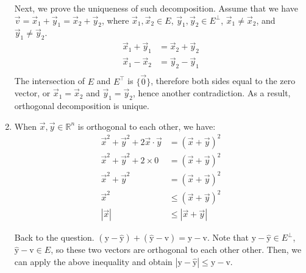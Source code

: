 \documentclass{article}
\begin{document}
\begin{enumerate}[1.]
Next, we prove the uniqueness of such decomposition. Assume that we have $\vec{v} = \vec{x}_1 + \vec{y}_1 = \vec{x}_2 + \vec{y}_2$, where $\vec{x}_1, \vec{x}_2 \in E$, $\vec{y}_1, \vec{y}_2 \in E^{\bot}$, $\vec{x}_1 \neq \vec{x}_2$, and $\vec{y}_1 \neq \vec{y}_2$.
$$
\begin{aligned}
\vec{x}_1 + \vec{y}_1 &= \vec{x}_2 + \vec{y}_2 \\
\vec{x}_1 - \vec{x}_2 &= \vec{y}_2 - \vec{y}_1 \\
\end{aligned}
$$
The intersection of $E$ and $E^{\top}$ is $\{\vec{0}\}$, therefore both sides equal to the zero vector, or $\vec{x}_1 = \vec{x}_2$ and $\vec{y}_1 = \vec{y}_2$, hence another contradiction. As a result, orthogonal decomposition is unique. \rQED

\item
When $\vec{x}, \vec{y} \in \mathbb{R}^n$ is orthogonal to each other, we have:
\begin{align*}
\vec{x}^2 + \vec{y}^2 + 2\vec{x}\cdot\vec{y} &= (\vec{x} + \vec{y})^2\\
\vec{x}^2 + \vec{y}^2 + 2 \times 0 &= (\vec{x} + \vec{y})^2\\
\vec{x}^2 + \vec{y}^2 &= (\vec{x} + \vec{y})^2 \\
\vec{x}^2 &\leq (\vec{x} + \vec{y})^2 \\
|\vec{x}| &\leq |\vec{x} + \vec{y}|
\end{align*}

\newcommand \vecb[1]{\boldsymbol{\mathrm{#1}}}

Back to the question. $(\vecb{y} - \vecb{\hat{y}}) + (\vecb{\hat{y}} - \vecb{v}) = \vecb{y} - \vecb{v}$. Note that $\vecb{y} - \vecb{\hat{y}} \in E^{\bot}$, $\vecb{\hat{y}} - \vecb{v} \in E$, so these two vectors are orthogonal to each other other. Then, we can apply the above inequality and obtain $|\vecb{y} - \vecb{\hat{y}}| \leq \vecb{y} - \vecb{v}$. \rQED


\end{enumerate}
\end{document}
